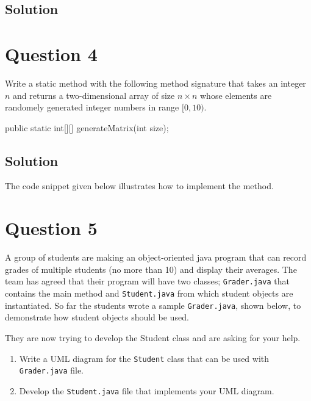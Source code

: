 \documentclass[12pt,letterpaper,twoside]{article}
\begin{document}
\subsection*{Solution}



\newpage

\section*{Question 4}

Write a static method with the following method signature that takes an integer $n$ and returns a two-dimensional array of size $n \times n$ whose elements are randomely generated integer numbers in range $[0, 10)$.

\begin{terminal}
public static int[][] generateMatrix(int size);
\end{terminal}

\subsection*{Solution}

The code snippet given below illustrates how to implement the method.



\newpage

\section*{Question 5}

A group of students are making an object-oriented java program that can record grades of multiple students (no more than 10) and display their averages.
The team has agreed that their program will have two classes; \texttt{Grader.java} that contains the main method and \texttt{Student.java} from which student objects are instantiated.
So far the students wrote a sample \texttt{Grader.java}, shown below, to demonstrate how student objects should be used.



They are now trying to develop the Student class and are asking for your help.

\begin{enumerate}
	\item Write a UML diagram for the \texttt{Student} class that can be used with \texttt{Grader.java} file.
	\item Develop the \texttt{Student.java} file that implements your UML diagram.
\end{enumerate}
\end{document}
